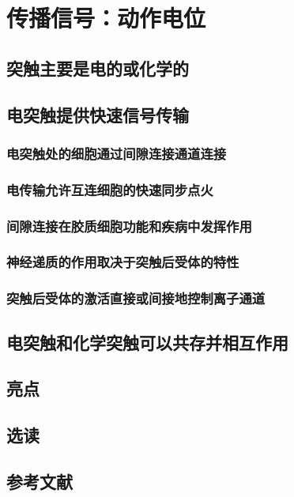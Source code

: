 \chapter{传播信号：动作电位}

\section{突触主要是电的或化学的}

\section{电突触提供快速信号传输}
\subsection{电突触处的细胞通过间隙连接通道连接}
\subsection{电传输允许互连细胞的快速同步点火}
\subsection{间隙连接在胶质细胞功能和疾病中发挥作用}
\subsection{神经递质的作用取决于突触后受体的特性}
\subsection{突触后受体的激活直接或间接地控制离子通道}

\section{电突触和化学突触可以共存并相互作用}


\section{亮点}

\section{选读}

\section{参考文献}

